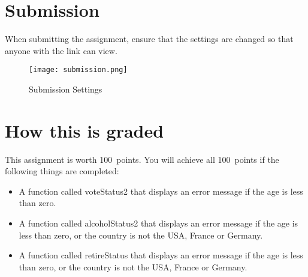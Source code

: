 \documentclass{article}
\newcommand{\AValue}{100}
\begin{document}
\section*{Submission}
When submitting the assignment, ensure that the settings are changed so that anyone with the link can view.
\begin{figure}[H]
  \centering
  \texttt{[image: submission.png]}
  \caption{Submission Settings}
\end{figure}

\section*{How this is graded}
This assignment is worth \AValue \ points. You will achieve all \AValue \   points if the following things are completed:
\begin{itemize}
    \item A function called voteStatus2 that displays an error message if the age is less than zero.
    \item A function called alcoholStatus2 that displays an error message if the age is less than zero, or the country is not the USA, France or Germany.
    \item A function called retireStatus that displays an error message if the age is less than zero, or the country is not the USA, France or Germany.
\end{itemize}
\end{document}
